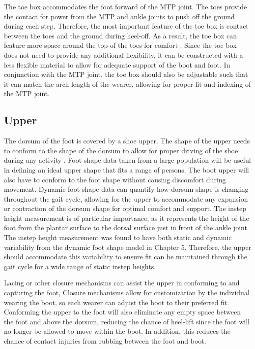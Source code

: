 \documentclass[defaultstyle,11pt]{comps}
\begin{document}
The toe box accommodates the foot forward of the MTP joint.
The toes provide the contact for power from the MTP and ankle joints to push off the ground during each step.
Therefore, the most important feature of the toe box is contact between the toes and the ground during heel-off.
As a result, the toe box can feature more space around the top of the toes for comfort \citep{Luximon2009}.
Since the toe box does not need to provide any additional flexibility, it can be constructed with a less flexible material to allow for adequate support of the boot and foot.
In conjunction with the MTP joint, the toe box should also be adjustable such that it can match the arch length of the wearer, allowing for proper fit and indexing of the MTP joint.

\hypertarget{upper}{%
\subsection{Upper}\label{upper}}

The dorsum of the foot is covered by a shoe upper.
The shape of the upper needs to conform to the shape of the dorsum to allow for proper driving of the shoe during any activity \citep{Feeney2019}.
Foot shape data taken from a large population will be useful in defining an ideal upper shape that fits a range of persons.
The boot upper will also have to conform to the foot shape without causing discomfort during movement.
Dynamic foot shape data can quantify how dorsum shape is changing throughout the gait cycle, allowing for the upper to accommodate any expansion or contraction of the dorsum shape for optimal comfort and support.
The instep height measurement is of particular importance, as it represents the height of the foot from the plantar surface to the dorsal surface just in front of the ankle joint.
The instep height measurement was found to have both static and dynamic variability from the dynamic foot shape model in Chapter 5.
Therefore, the upper should accommodate this variability to ensure fit can be maintained through the gait cycle for a wide range of static instep heights.

Lacing or other closure mechanisms can assist the upper in conforming to and capturing the foot,
Closure mechanisms allow for customization by the individual wearing the boot, so each wearer can adjust the boot to their preferred fit.
Conforming the upper to the foot will also eliminate any empty space between the foot and above the dorsum, reducing the chance of heel-lift since the foot will no longer be allowed to move within the boot.
In addition, this reduces the chance of contact injuries from rubbing between the foot and boot.
\end{document}
